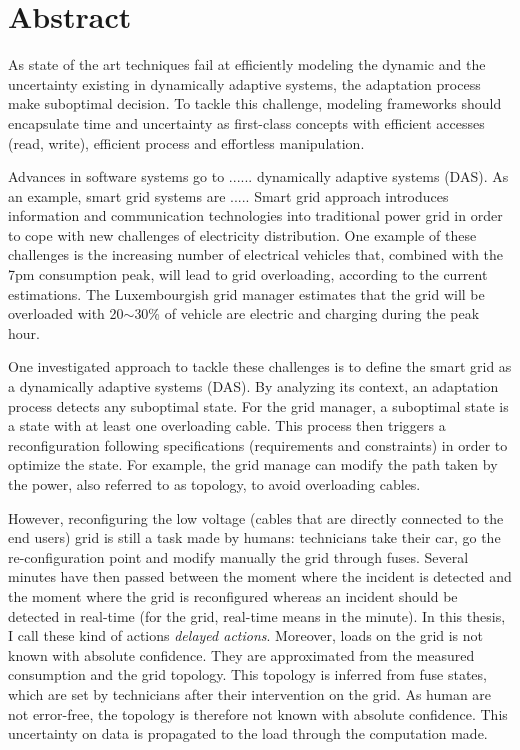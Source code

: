 \chapter*{Abstract}

{
	As state of the art techniques fail at efficiently modeling the dynamic and the uncertainty existing in dynamically adaptive systems, the adaptation process make suboptimal decision.
	To tackle this challenge, modeling frameworks should encapsulate time and uncertainty as first-class concepts with efficient accesses (read, write), efficient process and effortless manipulation.
}

Advances in software systems go to ...... dynamically adaptive systems (DAS).
As an example, smart grid systems are .....
Smart grid approach introduces information and communication technologies into traditional power grid in order to cope with new challenges of electricity distribution.
One example of these challenges is the increasing number of electrical vehicles that, combined with the 7pm consumption peak, will lead to grid overloading, according to the current estimations.
The Luxembourgish grid manager estimates that the grid will be overloaded with 20$\sim$30\% of vehicle are electric and charging during the peak hour.

One investigated approach to tackle these challenges is to define the smart grid as a dynamically adaptive systems (DAS).
By analyzing its context, an adaptation process detects any suboptimal state.
For the grid manager, a suboptimal state is a state with at least one overloading cable.
This process then triggers a reconfiguration following specifications (requirements and constraints) in order to optimize the state.
For example, the grid manage can modify the path taken by the power, also referred to as topology, to avoid overloading cables.

However, reconfiguring the low voltage (cables that are directly connected to the end users) grid is still a task made by humans: technicians take their car, go the re-configuration point and modify manually the grid through fuses.
Several minutes have then passed between the moment where the incident is detected and the moment where the grid is reconfigured whereas an incident should be detected in real-time (for the grid, real-time means in the minute).
In this thesis, I call these kind of actions \textit{delayed actions}.
Moreover, loads on the grid is not known with absolute confidence.
They are approximated from the measured consumption and the grid topology.
This topology is inferred  from fuse states, which are set by technicians after their intervention on the grid.
As human are not error-free, the topology is therefore not known with absolute confidence.
This uncertainty on data is propagated to the load through the computation made.

